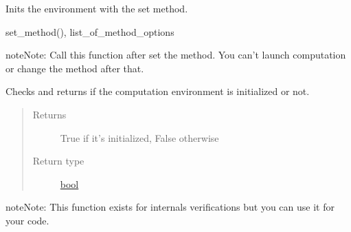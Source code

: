 \documentclass[letterpaper,10pt,english]{sphinxmanual}
\begin{document}

\begin{fulllineitems}
\label{doc:gedlibpy.init_method}
Inits the environment with the set method.




set\_method(), list\_of\_method\_options



\begin{notice}{note}{Note:}
Call this function after set the method. You can't launch computation or change the method after that.
\end{notice}

\end{fulllineitems}


\begin{fulllineitems}
\label{doc:gedlibpy.is_initialized}
Checks and returns if the computation environment is initialized or not.
\begin{quote}\begin{description}
\item[{Returns}] \leavevmode
True if it's initialized, False otherwise

\item[{Return type}] \leavevmode
\href{https://docs.python.org/3/library/functions.html\#bool}{bool}

\end{description}\end{quote}

\begin{notice}{note}{Note:}
This function exists for internals verifications but you can use it for your code.
\end{notice}

\end{fulllineitems}

\end{document}
